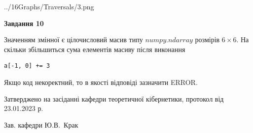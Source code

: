 \documentclass[12pt, ukrainian]{article}
\begin{document}
{\begin {large}
\begin{center}
	{../16Graphs/Traversals/3.png}
\end{center}\par
\newpage

{\begin {center}\textbf{Завдання 10}\end {center}}\par
Значенням змінної  є цілочисловий масив типу $numpy.ndarray$ розмірів $6{\times}6$. На скільки збільшиться сума елементів масиву  після виконання
\begin{verbatim}
a[-1, 0] += 3
\end{verbatim}


Якщо код некоректний, то в якості відповіді зазначити ERROR.\par
\newpage


\end {large}
}
{\smallskip \begin {small} Затверджено на засіданні кафедри теоретичної кібернетики, протокол  від   23.01.2023 р.\par\smallskip\smallskip
{\parbox {6.5 cm}{Зав. кафедри \dotfill Ю.В.~Крак}} \end{small}}
\end{document}
